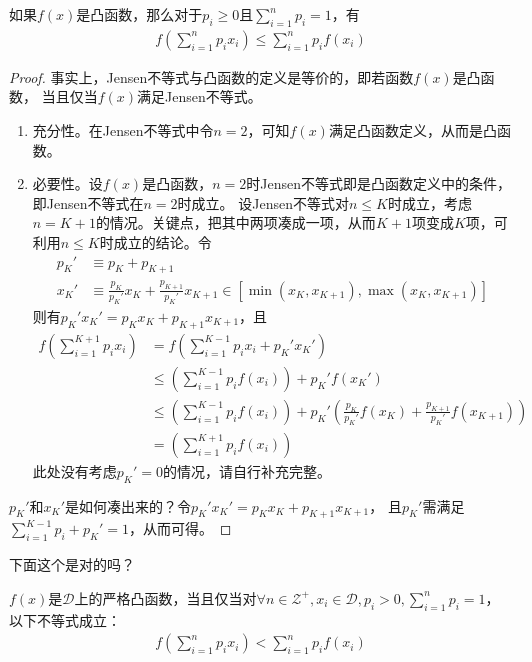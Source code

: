 \begin{theorem}
  如果$f(x)$是凸函数，那么对于$p_i\ge0$且$\sum_{i=1}^{n}p_i=1$，有
  \begin{align}
    f(\sum_{i=1}^{n}p_ix_i)\le \sum_{i=1}^{n}p_i f(x_i)
  \end{align}
\end{theorem}

\begin{proof}
  事实上，Jensen不等式与凸函数的定义是等价的，即若函数$f(x)$是凸函数，
  当且仅当$f(x)$满足Jensen不等式。
  \begin{enumerate}
  \item 充分性。在Jensen不等式中令$n=2$，可知$f(x)$满足凸函数定义，从而是凸函数。
  \item 必要性。设$f(x)$是凸函数，$n=2$时Jensen不等式即是凸函数定义中的条件，即Jensen不等式在$n=2$时成立。
    设Jensen不等式对$n\le K$时成立，考虑$n=K+1$的情况。关键点，把其中两项凑成一项，从而$K+1$项变成$K$项，可利用$n\le K$时成立的结论。令
    \begin{align*}
      p_K'&\equiv p_K+p_{K+1}\\
      x_K'&\equiv\frac{p_K}{p_K'}x_K + \frac{p_{K+1}}{p_K'}x_{K+1}\in[\min{(x_K, x_{K+1})}, \max{(x_K, x_{K+1})}]
    \end{align*}
    则有$p_K'x_K' = p_Kx_K + p_{K+1}x_{K+1}$，且
    \begin{align*}
      f\left(\sum_{i=1}^{K+1}p_ix_i\right) &= f\left(\sum_{i=1}^{K-1}p_ix_i  + p_K'x_K'\right)\\
      &\le \left(\sum_{i=1}^{K-1}p_if(x_i)\right) + p_K' f(x_K')\\
      &\le \left(\sum_{i=1}^{K-1}p_if(x_i)\right) + p_K'\left( \frac{p_K}{p_K'}f(x_K) + \frac{p_{K+1}}{p_K'}f(x_{K+1}) \right) \\
      &= \left(\sum_{i=1}^{K+1}p_i f(x_i)\right)
    \end{align*}
    此处没有考虑$p_K'=0$的情况，请自行补充完整。
  \end{enumerate}
  
  \note $p_K'$和$x_K'$是如何凑出来的？令$p_K'x_K' = p_Kx_K + p_{K+1}x_{K+1}$，
  且$p_K'$需满足$\sum_{i=1}^{K-1}p_i + p_K'=1$，从而可得。
\end{proof}

{\color{red}下面这个是对的吗？}
\begin{theorem}
  $f(x)$是$\mathcal{D}$上的严格凸函数，当且仅当对$\forall n\in\mathcal{Z}^+, x_i\in\mathcal{D}, p_i>0, \sum_{i=1}^{n}p_i=1$，以下不等式成立：
  \begin{align*}
    f\left(\sum_{i=1}^{n} p_i x_i\right) < \sum_{i=1}^{n} p_i f(x_i)
  \end{align*}
\end{theorem}



